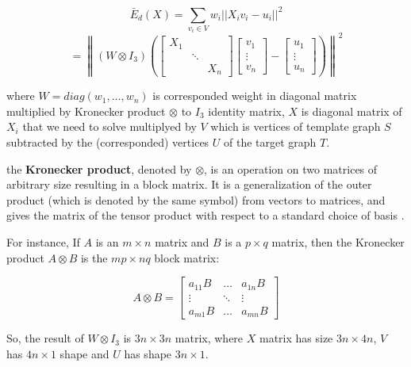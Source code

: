 \documentclass[../structure.tex]{subfiles}
\begin{document}
\begin{equation}
\bar{E}_{d}(X) = \sum_{v_{i}\in V} w_{i}||X_{i}v_{i}-u_{i}||^2
\label{equ:distance2}
\end{equation}
\begin{equation*}
= \left\|(W \otimes I_{3}) \left( 
\begin{bmatrix}
X_{1} & & \\ 
 & \ddots & \\
 & & X_{n}
\end{bmatrix}
\begin{bmatrix}
v_{1} \\ \vdots \\ v_{n}
\end{bmatrix} - 
\begin{bmatrix}
u_{1}\\ \vdots \\ u_{n}
\end{bmatrix}
\right) \right\|^2
\end{equation*}

where $W = diag(w_{1},\dots, w_{n})$ is corresponded weight in diagonal matrix multiplied by Kronecker product $\otimes$ to $I_{3}$ identity matrix, $X$ is diagonal matrix of $X_{i}$ that we need to solve multiplyed by $V$ which is vertices of template graph $S$ subtracted by the (corresponded) vertices $U$ of the target graph $T$.

the \textbf{Kronecker product}, denoted by $\otimes$, is an operation on two matrices of arbitrary size resulting in a block matrix. It is a generalization of the outer product (which is denoted by the same symbol) from vectors to matrices, and gives the matrix of the tensor product with respect to a standard choice of basis \cite{Wikipedia2019}.

For instance, If $A$ is an $m \times n$ matrix and $B$ is a $p \times q$ matrix, then the Kronecker product $A \otimes B$ is the $mp \times nq$ block matrix:

\begin{equation*}
A \otimes B = 
\begin{bmatrix}
a_{11}B & \dots  & a_{1n}B \\
\vdots  & \ddots & \vdots  \\
a_{m1}B & \dots  & a_{mn}B
\end{bmatrix}
\end{equation*}

So, the result of $W \otimes I_{3}$ is $3n\times 3n$ matrix, where $X$ matrix has size $3n\times4n$, $V$ has $4n\times1$ shape and $U$ has shape $3n\times1$.
\end{document}
